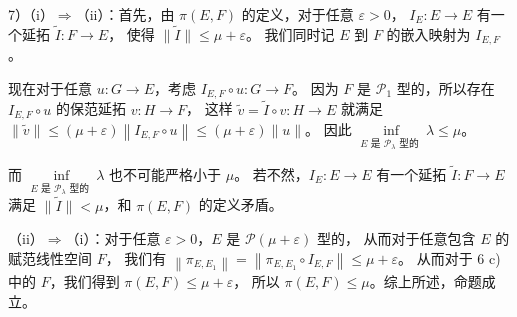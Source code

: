 \begin{enumerate}
\begin{proofc}
7）（i）$\Rightarrow$（ii）：首先，由 $\pi(E, F)$ 的定义，对于任意 $\varepsilon>0$，
$I_{E}: E \rightarrow E$ 有一个延拓 $\tilde{I}: F \rightarrow E$，
使得 $\|\tilde{I}\| \leqslant \mu+\varepsilon$。
我们同时记 $E$ 到 $F$ 的嵌入映射为 $I_{E, F}$。

现在对于任意 $u: G \rightarrow E$，考虑 $I_{E, F} \circ u: G \rightarrow F$。
因为 $F$ 是 $\mathcal{P}_{1}$ 型的，所以存在 $I_{E, F} \circ u$ 的保范延拓 $v: H \rightarrow F$，
这样 $\tilde{v}=\tilde{I} \circ v: H \rightarrow E$ 就满足 $\|\tilde{v}\| \leqslant(\mu+\varepsilon)\left\|I_{E, F} \circ u\right\| \leqslant(\mu+\varepsilon)\|u\|$。
因此 $\inf\limits_{E \text { 是 } \mathcal{P}_{\lambda} \text { 型的 }} \lambda \leqslant \mu$。

而 $\inf\limits_{E \text { 是 } \mathcal{P}_{\lambda} \text { 型的 }} \lambda$ 也不可能严格小于 $\mu$。
若不然，$I_{E}: E \rightarrow E$ 有一个延拓 $\tilde{I}:F \rightarrow E$ 满足 $\|\tilde{I}\|<\mu$，和 $\pi(E, F)$ 的定义矛盾。

（ii）$\Rightarrow$（i）：对于任意 $\varepsilon>0$，$E$ 是 $\mathcal{P}(\mu+\varepsilon)$ 型的，
从而对于任意包含 $E$ 的赋范线性空间 $F$，
我们有 $\left\|\pi_{E, E_{1}}\right\|=\left\|\pi_{E, E_{1}} \circ I_{E, F}\right\| \leqslant \mu+\varepsilon$。
从而对于 6 c) 中的 $F$，我们得到 $\pi(E, F) \leqslant \mu+\varepsilon$，
所以 $\pi(E, F) \leqslant \mu$。综上所述，命题成立。
\end{proofc}
\end{enumerate}

